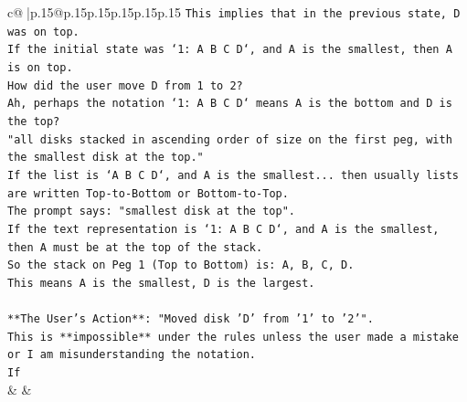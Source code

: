\documentclass{article}
\begin{document}
{\begin{supertabular}{c@{$\;$}|p{.15\linewidth}@{}p{.15\linewidth}p{.15\linewidth}p{.15\linewidth}p{.15\linewidth}p{.15\linewidth}}
{{{\texttt{This implies that in the previous state, D was on top.} \\
\texttt{If the initial state was `1: A B C D`, and A is the smallest, then A is on top.} \\
\texttt{How did the user move D from 1 to 2?} \\
\texttt{Ah, perhaps the notation `1: A B C D` means A is the bottom and D is the top?} \\
\texttt{"all disks stacked in ascending order of size on the first peg, with the smallest disk at the top."} \\
\texttt{If the list is `A B C D`, and A is the smallest... then usually lists are written Top{-}to{-}Bottom or Bottom{-}to{-}Top.} \\
\texttt{The prompt says: "smallest disk at the top".} \\
\texttt{If the text representation is `1: A B C D`, and A is the smallest, then A must be at the top of the stack.} \\
\texttt{So the stack on Peg 1 (Top to Bottom) is: A, B, C, D.} \\
\texttt{This means A is the smallest, D is the largest.} \\
\\ 
\texttt{**The User's Action**: "Moved disk 'D' from '1' to '2'".} \\
\texttt{This is **impossible** under the rules unless the user made a mistake or I am misunderstanding the notation.} \\
\texttt{If} \\
            }
        }
    }
    & & \\ \\


\end{supertabular}}
\end{document}
